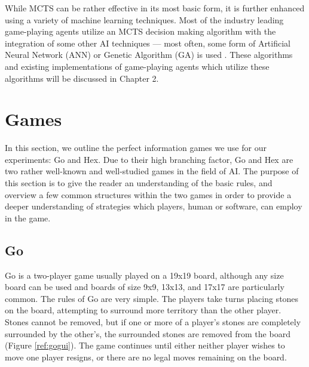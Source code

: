 While MCTS can be rather effective in its most basic form, it is further enhanced using a variety of machine learning techniques.  Most of the industry leading game-playing agents utilize an MCTS decision making algorithm with the integration of some other AI techniques --- most often, some form of Artificial Neural Network (ANN) or Genetic Algorithm (GA) is used \cite{browne2012survey}.  These algorithms and existing implementations of game-playing agents which utilize these algorithms will be discussed in Chapter 2.


\section{Games}\label{sec:games}
In this section, we outline the perfect information games we use for our experiments: Go and Hex.  Due to their high branching factor, Go and Hex are two rather well-known and well-studied games in the field of AI.  The purpose of this section is to give the reader an understanding of the basic rules, and overview a few common structures within the two games in order to provide a deeper understanding of strategies which players, human or software, can employ in the game.

\subsection{Go}
Go is a two-player game usually played on a 19x19 board, although any size board can be used and boards of size 9x9, 13x13, and 17x17 are particularly common.  The rules of Go are very simple.  The players take turns placing stones on the board, attempting to surround more territory than the other player.  Stones cannot be removed, but if one or more of a player's stones are completely surrounded by the other's, the surrounded stones are removed from the board (Figure \ref{ref:gogui}).  The game continues until either neither player wishes to move one player resigns, or there are no legal moves remaining on the board.

